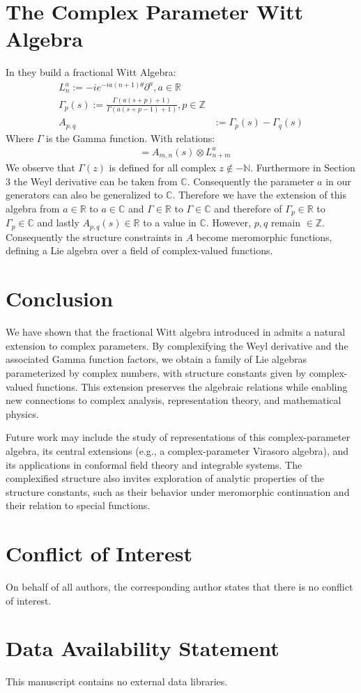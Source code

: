 \documentclass{artjlt}
\newcommand{\?}{\textbackslash}
\newcommand{\C}{\mathbb{C}}
\newcommand{\R}{\mathbb{R}}
\newcommand{\Z}{\mathbb{Z}}
\begin{document}
\section{The Complex Parameter Witt Algebra}
In \cite{La_Nave_2019} they build a fractional Witt Algebra:
\begin{align*}
  L_n^a := -i e^{-i a(n+1)\theta}\partial^a , a \in \R \\
  \Gamma_p (s) := \frac{\Gamma(a(s+p)+1)}{\Gamma(a(s+p-1)+1)} , p \in \Z\\
  A_{p,q} &:= \Gamma_p(s) - \Gamma_q(s) 
\end{align*}
Where $\Gamma$ is the Gamma function. 
With relations:
\begin{align*}
  [L_n^a,L_m^a] &= A_{m,n} (s) \otimes L_{n+m}^a
\end{align*}
We observe that $\Gamma(z) $ is defined for all complex $z \not \in - \mathbb{N}$. Furthermore in Section 3 the Weyl derivative can be taken from $\C$. Consequently the parameter $a$ in our generators can also be generalized to $\C$.
Therefore we have the extension of this algebra from $a \in \R$ to $a \in \C$ and $\Gamma \in \R$ to $\Gamma \in \C$ and therefore of $\Gamma_p \in \R$ to $\Gamma_p \in \C$ and lastly $A_{p,q} (s) \in \R$ to a value in $\C$. 
However, $p,q$ remain $\in \Z$. Consequently the structure constraints in $A$ become meromorphic functions, defining a Lie algebra over a field of complex-valued functions.  
\section{Conclusion}
We have shown that the fractional Witt algebra introduced in \cite{LaNave2019} admits a natural extension to complex parameters. By complexifying the Weyl derivative and the associated Gamma function factors, we obtain a family of Lie algebras parameterized by complex numbers, with structure constants given by complex-valued functions. This extension preserves the algebraic relations while enabling new connections to complex analysis, representation theory, and mathematical physics. 

Future work may include the study of representations of this complex-parameter algebra, its central extensions (e.g., a complex-parameter Virasoro algebra), and its applications in conformal field theory and integrable systems. The complexified structure also invites exploration of analytic properties of the structure constants, such as their behavior under meromorphic continuation and their relation to special functions.
\section*{Conflict of Interest}
On behalf of all authors, the corresponding author states that there is no conflict of interest.
\section*{Data Availability Statement}
This manuscript contains no external data libraries.
\end{document}
